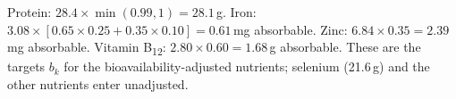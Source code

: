 Protein: $28.4\times\min(0.99,1) = 28.1$\,g. Iron: $3.08\times[0.65\times0.25 + 0.35\times0.10] = 0.61$\,mg absorbable. Zinc: $6.84\times0.35 = 2.39$\,mg absorbable. Vitamin B\textsubscript{12}: $2.80\times0.60 = 1.68$\,\textmu g absorbable. These are the targets $b_k$ for the bioavailability-adjusted nutrients; selenium (21.6\,\textmu g) and the other nutrients enter unadjusted.
